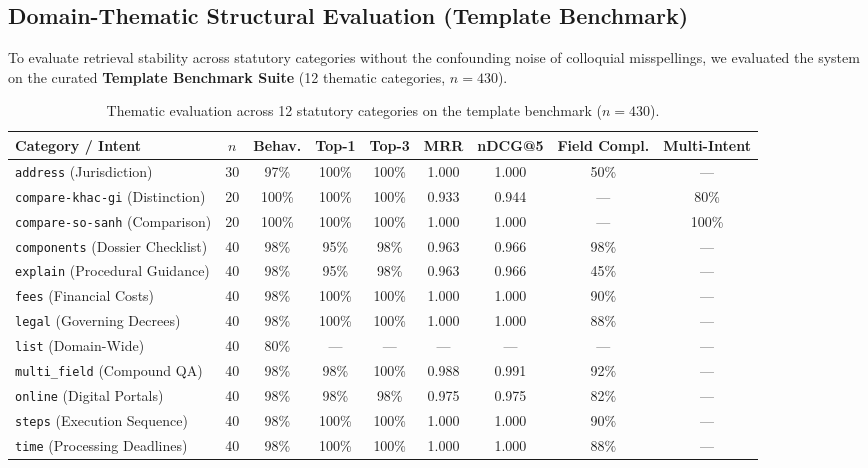 \documentclass[11pt,a4paper]{article}
\begin{document}
\subsection{Domain-Thematic Structural Evaluation (Template Benchmark)}
To evaluate retrieval stability across statutory categories without the confounding noise of colloquial
misspellings, we evaluated the system on the curated \textbf{Template Benchmark Suite} (12 thematic
categories, $n=430$).

\begin{table}[htbp]
\centering
\caption{Thematic evaluation across 12 statutory categories on the template benchmark ($n=430$).}
\label{tab:thematic}
\footnotesize
\begin{adjustbox}{max width=\textwidth}
\begin{tabular}{@{}lcccccccc@{}}
\toprule
\textbf{Category / Intent} & \textbf{$n$} & \textbf{Behav.} & \textbf{Top-1} & \textbf{Top-3} &
\textbf{MRR} & \textbf{nDCG@5} & \textbf{Field Compl.} & \textbf{Multi-Intent}\\
\midrule
\texttt{address} (Jurisdiction) & 30 & 97\% & 100\% & 100\% & 1.000 & 1.000 & 50\% & ---\\
\texttt{compare-khac-gi} (Distinction) & 20 & 100\% & 100\% & 100\% & 0.933 & 0.944 & --- & 80\%\\
\texttt{compare-so-sanh} (Comparison) & 20 & 100\% & 100\% & 100\% & 1.000 & 1.000 & --- & 100\%\\
\texttt{components} (Dossier Checklist) & 40 & 98\% & 95\% & 98\% & 0.963 & 0.966 & 98\% & ---\\
\texttt{explain} (Procedural Guidance) & 40 & 98\% & 95\% & 98\% & 0.963 & 0.966 & 45\% & ---\\
\texttt{fees} (Financial Costs) & 40 & 98\% & 100\% & 100\% & 1.000 & 1.000 & 90\% & ---\\
\texttt{legal} (Governing Decrees) & 40 & 98\% & 100\% & 100\% & 1.000 & 1.000 & 88\% & ---\\
\texttt{list} (Domain-Wide) & 40 & 80\% & --- & --- & --- & --- & --- & ---\\
\texttt{multi\_field} (Compound QA) & 40 & 98\% & 98\% & 100\% & 0.988 & 0.991 & 92\% & ---\\
\texttt{online} (Digital Portals) & 40 & 98\% & 98\% & 98\% & 0.975 & 0.975 & 82\% & ---\\
\texttt{steps} (Execution Sequence) & 40 & 98\% & 100\% & 100\% & 1.000 & 1.000 & 90\% & ---\\
\texttt{time} (Processing Deadlines) & 40 & 98\% & 100\% & 100\% & 1.000 & 1.000 & 88\% & ---\\
\bottomrule
\end{tabular}
\end{adjustbox}
\end{table}
\end{document}
